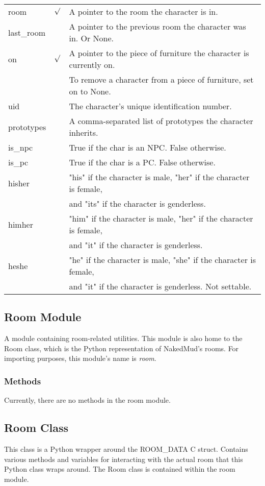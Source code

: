 \documentclass[12pt]{article}
\begin{document}
\begin{tabular}{|l|c|l|}
room    & \begin{math}\surd\end{math} & A pointer to the room the character is in. \\
last\_room & & A pointer to the previous room the character was in. Or None. \\
on      & \begin{math}\surd\end{math} & A pointer to the piece of furniture the character is currently on. \\
&& To remove a character from a piece of furniture, set on to None. \\
uid     & & The character's unique identification number. \\
prototypes & & A comma-separated list of prototypes the character inherits. \\
is\_npc & & True if the char is an NPC. False otherwise. \\
is\_pc  & & True if the char is a PC. False otherwise. \\
hisher  & & "his" if the character is male, "her" if the character is female, \\
&& and "its" if the character is genderless. \\
himher  & & "him" if the character is male, "her" if the character is female, \\
&& and "it" if the character is genderless. \\
heshe   & & "he" if the character is male, "she" if the character is female, \\
&& and "it" if the character is genderless. Not settable. \\
\hline
\end{tabular}



\subsection{Room Module}
A module containing room-related utilities. This module is also home to the Room class, which is the Python representation of NakedMud's rooms. For importing purposes, this module's name is {\it room}.

\subsubsection{Methods}
Currently, there are no methods in the room module.


\subsection{Room Class}
This class is a Python wrapper around the ROOM\_DATA C struct. Contains various methods and variables for interacting with the actual room that this Python class wraps around. The Room class is contained within the room module.
\end{document}

